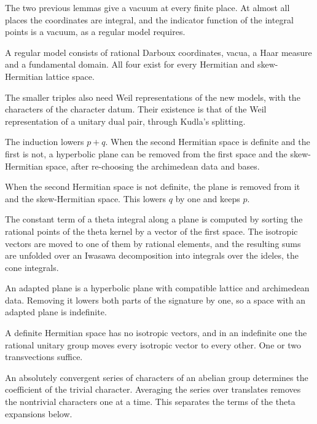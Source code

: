 The two previous lemmas give a vacuum at every finite place. At almost all
places the coordinates are integral, and the indicator function of the
integral points is a vacuum, as a regular model requires.

A regular model consists of rational Darboux coordinates, vacua, a Haar
measure and a fundamental domain. All four exist for every Hermitian and
skew-Hermitian lattice space.

The smaller triples also need Weil representations of the new models, with
the characters of the character datum. Their existence is that of the Weil
representation of a unitary dual pair, through Kudla's splitting.

The induction lowers $p+q$. When the second Hermitian space is definite and the
first is not, a hyperbolic plane can be removed from the first space and the
skew-Hermitian space, after re-choosing the archimedean data and bases.

When the second Hermitian space is not definite, the plane is removed from it
and the skew-Hermitian space. This lowers $q$ by one and keeps $p$.

The constant term of a theta integral along a plane is computed by sorting the
rational points of the theta kernel by a vector of the first space. The
isotropic vectors are moved to one of them by rational elements, and the
resulting sums are unfolded over an Iwasawa decomposition into integrals over
the ideles, the cone integrals.

An adapted plane is a hyperbolic plane with compatible lattice and archimedean
data. Removing it lowers both parts of the signature by one, so a space with an
adapted plane is indefinite.

A definite Hermitian space has no isotropic vectors, and in an indefinite one
the rational unitary group moves every isotropic vector to every other. One or
two transvections suffice.

An absolutely convergent series of characters of an abelian group determines
the coefficient of the trivial character. Averaging the series over translates
removes the nontrivial characters one at a time. This separates the terms of
the theta expansions below.

